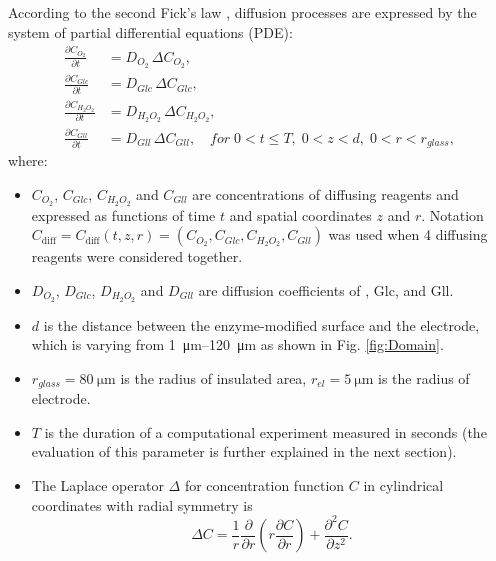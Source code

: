 According to the second Fick’s law \cite{laforge2008physicochemical}, diffusion processes are expressed by the system of partial differential equations (PDE):
\begin{equation}
  \begin{aligned}\label{eq:reakc_eq1}
  \frac{\partial C_{O_2}}{\partial t} &= D_{O_2}\,\Delta C_{O_2},\\
  \frac{\partial C_{Glc}}{\partial t} &= D_{Glc}\,\Delta C_{Glc},\\
  \frac{\partial C_{H_2 O_2}}{\partial t} &= D_{H_2 O_2} \,\Delta C_{H_2 O_2},\\
  \frac{\partial C_{Gll}}{\partial t} &= D_{Gll}\,\Delta C_{Gll},  \quad for\; 0<t\leq T,\; 0<z<d,\; 0<r<r_{glass},
  \end{aligned}
\end{equation}
where:
\begin{itemize}
  \item[] $C_{O_2}$, $C_{Glc}$, $C_{H_2 O_2}$ and $ C_{Gll}$ are concentrations of diffusing reagents and expressed as functions of time $t$ and spatial coordinates $z$ and $r$. Notation $C_{\text{diff}} = C_{\text{diff}} \left( t, z, r \right) = \left( C_{O_2}, C_{Glc}, \allowbreak C_{H_2 O_2}, \allowbreak C_{Gll} \right)$ was used when 4 diffusing re\-agents were considered together.
  \item[] $D_{O_2}$, $D_{Glc}$, $D_{H_2 O_2}$ and $D_{Gll}$ are diffusion coefficients of , Glc,  and Gll.
  \item[] $d$ is the distance between the enzyme-modified surface and the electrode, which is varying from \SIrange{1}{120}{\um} as shown in Fig. \ref{fig:Domain}.
  \item[] $r_{glass} = \SI{80}{\um}$ is the radius of insulated area, $r_{el} = \SI{5}{\um}$ is the radius of electrode.
  \item[] $T$ is the duration of a computational experiment measured in seconds (the evaluation of this parameter is further explained in the next section).
  \item[] The Laplace operator $\Delta$ for concentration function $C$ in cylindrical coordinates with radial symmetry is
  \begin{equation*}
  \Delta C = \frac{1}{r}\frac{\partial }{\partial r} \left( r\frac{\partial C }{\partial r} \right) + \frac{\partial^{2} C}{\partial z^{2}}.
  \end{equation*}
\end{itemize}


